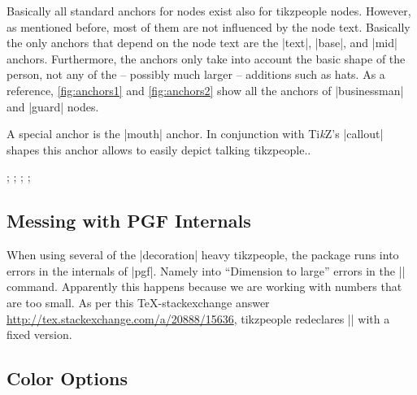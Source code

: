 \documentclass{ltxdoc}
\newcommand{\tikzname}{Ti\emph{k}Z\xspace}
\begin{document}
	Basically all standard anchors for nodes exist also for tikzpeople nodes.
	However, as mentioned before, most of them are not influenced by the node text.
	Basically the only anchors that depend on the node text are the |text|, |base|, and |mid| anchors.
	Furthermore, the anchors only take into account the basic shape of the person, not any of the -- possibly much larger -- additions such as hats.
	As a reference, \autoref{fig:anchors1} and \autoref{fig:anchors2} show all the anchors of |businessman| and |guard| nodes.
	
	A special anchor is the |mouth| anchor. In conjunction with \tikzname's |callout| shapes this anchor allows to easily depict talking \textsf{tikzpeople}..
	\begin{codeexample}{4.6cm}
\node[name=a,shape=police,minimum size=1cm,xshift=-1.25cm] {};
\node[name=b,shape=criminal,minimum size=1cm,mirrored,xshift=1.25cm] {};
;
;
	\end{codeexample}

\subsection{Messing with PGF Internals}
When using several of the |decoration| heavy \textsf{tikzpeople}, the package runs into errors in the internals of |pgf|.
Namely into ``Dimension to large'' errors in the |\pgfmath@function@veclen| command.
Apparently this happens because we are working with numbers that are too small.
As per this \TeX-stackexchange answer \url{http://tex.stackexchange.com/a/20888/15636}, \textsf{tikzpeople} redeclares |\pgfmath@function@veclen| with a fixed version.


\clearpage
\begin{appendices}
	\section{Color Options}
		\label{app:colors}
		\vfill{}
		\vfill{}
		\vfill{}
		\vfill{}
		\vfill{}
		\vfill{}
		\vfill{}
		\vfill{}
		\vfill{}
		\vfill{}
		\vfill{}
		\vfill{}
		\vfill{}
		\vfill{}
		\vfill{}
		\vfill{}
		\vfill{}
		\vfill{}
		\vfill{}
		\vfill{}
		\vfill{}
		\vfill{}
		\vfill{}
		\vfill{}
		\vfill{}
		\vfill{}
		\vfill{}
		\vfill{}
	\end{appendices}
\end{document}
